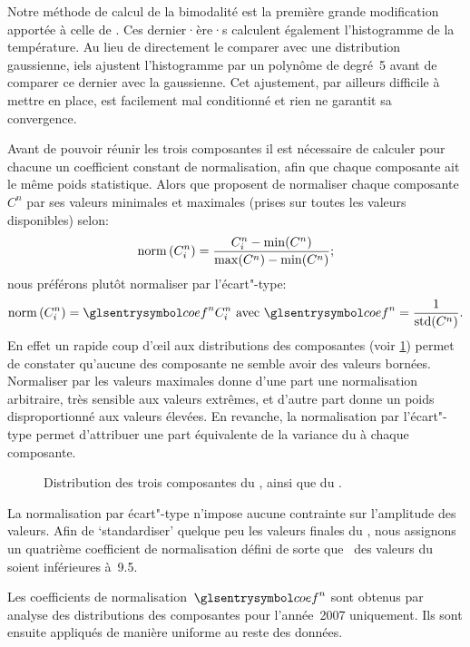 Notre méthode de calcul de la bimodalité est la première grande modification apportée à celle de \textcite{liu_2016}.
Ces dernier·ère·s calculent également l'histogramme de la température. Au lieu de directement le comparer avec une distribution gaussienne, iels ajustent l'histogramme par un polynôme de degré~5 avant de comparer ce dernier avec la gaussienne.
Cet ajustement, par ailleurs difficile à mettre en place, est facilement mal conditionné et rien ne garantit sa convergence.

Avant de pouvoir réunir les trois composantes il est nécessaire de calculer pour chacune un coefficient constant de normalisation, afin que chaque composante ait le même poids statistique.
Alors que \textcite{liu_2016} proposent de normaliser chaque composante \(C^n\) par ses valeurs minimales et maximales (prises sur toutes les valeurs disponibles) selon:
\begin{equation}
  \operatorname{norm}\left(C_i^n\right) = \frac {C_i^n - \min(C^n)} {\max(C^n) - \min(C^n)} ;
\end{equation}
nous préférons plutôt normaliser par l'écart"-type:
\begin{equation}
  \norm{C_i^n} = \am{coef}^n C_i^n
  \text{ avec } \am{coef}^n = \frac {1} {\std(C^n)} .
\end{equation}
En effet un rapide coup d’œil aux distributions des composantes (voir \cref{fig:distrib-composantes}) permet de constater qu'aucune des composante ne semble avoir des valeurs bornées.
Normaliser par les valeurs maximales donne d'une part une normalisation arbitraire, très sensible aux valeurs extrêmes, et d'autre part donne un poids disproportionné aux valeurs élevées.
En revanche, la normalisation par l'écart"-type permet d'attribuer une part équivalente de la variance du  à chaque composante.

\begin{figure}
  \caption[Distribution des composantes du  et du ]{Distribution des trois composantes du , ainsi que du .}
  \label{fig:distrib-composantes}
\end{figure}

La normalisation par écart"-type n'impose aucune contrainte sur l'amplitude des valeurs.
Afin de \enquote*{standardiser} quelque peu les valeurs finales du , nous assignons un quatrième coefficient de normalisation défini de sorte que~ des valeurs du  soient inférieures à~\num{9.5}.

Les coefficients de normalisation~\(\am{coef}^n\) sont obtenus par analyse des distributions des composantes pour l'année~2007 uniquement. Ils sont ensuite appliqués de manière uniforme au reste des données.

